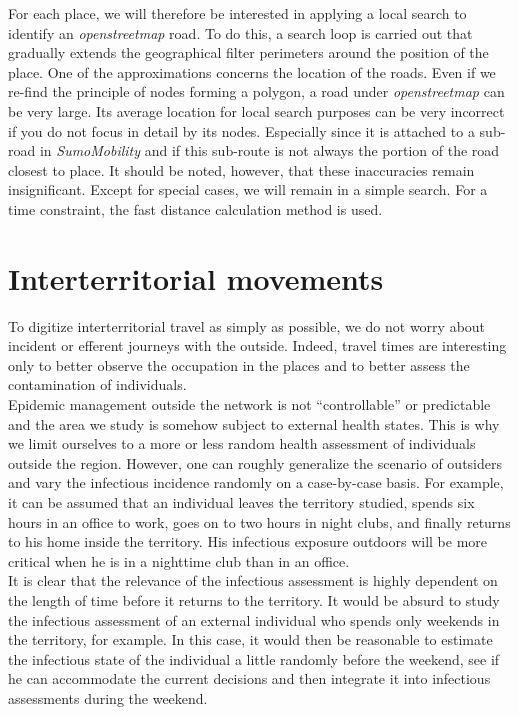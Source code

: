 For each place, we will therefore be interested in applying a local search to identify an \textit{openstreetmap} road. To do this, a search loop is carried out that gradually extends the geographical filter perimeters around the position of the place. One of the approximations concerns the location of the roads. Even if we re-find the principle of nodes forming a polygon, a road under \textit{openstreetmap} can be very large. Its average location for local search purposes can be very incorrect if you do not focus in detail by its nodes. Especially since it is attached to a sub-road in \textit{SumoMobility} and if this sub-route is not always the portion of the road closest to place. It should be noted, however, that these inaccuracies remain insignificant. Except for special cases, we will remain in a simple search. For a time constraint, the fast distance calculation method is used.\\

\pagebreak

\section{Interterritorial movements}

To digitize interterritorial travel as simply as possible, we do not worry about incident or efferent journeys with the outside. Indeed, travel times are interesting only to better observe the occupation in the places and to better assess the contamination of individuals.\\

Epidemic management outside the network is not ``controllable'' or predictable and the area we study is somehow subject to external health states. This is why we limit ourselves to a more or less random health assessment of individuals outside the region. However, one can roughly generalize the scenario of outsiders and vary the infectious incidence randomly on a case-by-case basis. For example, it can be assumed that an individual leaves the territory studied, spends six hours in an office to work, goes on to two hours in night clubs, and finally returns to his home inside the territory. His infectious exposure outdoors will be more critical when he is in a nighttime club than in an office.\\

It is clear that the relevance of the infectious assessment is highly dependent on the length of time before it returns to the territory. It would be absurd to study the infectious assessment of an external individual who spends only weekends in the territory, for example. In this case, it would then be reasonable to estimate the infectious state of the individual a little randomly before the weekend, see if he can accommodate the current decisions and then integrate it into infectious assessments during the weekend.\\

